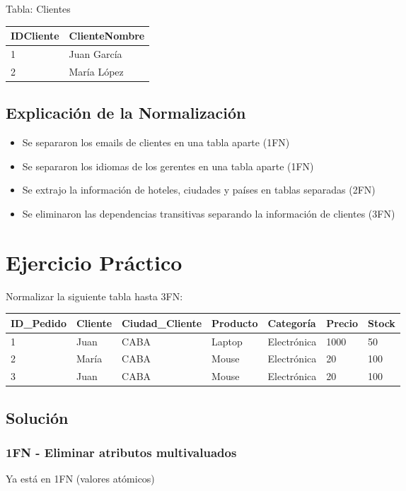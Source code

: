 \documentclass[12pt]{article}
\begin{document}
Tabla: Clientes
\begin{center}
\begin{tabular}{ll}
\toprule
IDCliente & ClienteNombre \\
\midrule
1 & Juan García \\
2 & María López \\
\bottomrule
\end{tabular}
\end{center}

\subsection{Explicación de la Normalización}
\begin{itemize}
    \item Se separaron los emails de clientes en una tabla aparte (1FN)
    \item Se separaron los idiomas de los gerentes en una tabla aparte (1FN)
    \item Se extrajo la información de hoteles, ciudades y países en tablas separadas (2FN)
    \item Se eliminaron las dependencias transitivas separando la información de clientes (3FN)
\end{itemize}

\section{Ejercicio Práctico}
Normalizar la siguiente tabla hasta 3FN:
\begin{center}
\begin{tabular}{lllllll}
\toprule
ID\_Pedido & Cliente & Ciudad\_Cliente & Producto & Categoría & Precio & Stock \\
\midrule
1 & Juan & CABA & Laptop & Electrónica & 1000 & 50 \\
2 & María & CABA & Mouse & Electrónica & 20 & 100 \\
3 & Juan & CABA & Mouse & Electrónica & 20 & 100 \\
\bottomrule
\end{tabular}
\end{center}

\subsection{Solución}

\subsubsection{1FN - Eliminar atributos multivaluados}
Ya está en 1FN (valores atómicos)
\end{document}
